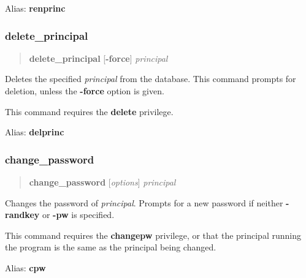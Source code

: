 \documentclass[letterpaper,10pt,english]{sphinxmanual}
\begin{document}
Alias: \textbf{renprinc}
\label{admin/admin_commands/kadmin_local:rename-principal-end}

\subsubsection{delete\_principal}
\label{admin/admin_commands/kadmin_local:id4}\label{admin/admin_commands/kadmin_local:delete-principal}\label{admin/admin_commands/kadmin_local:rename-principal-end}\begin{quote}

\textbf{delete\_principal} {[}\textbf{-force}{]} \emph{principal}
\end{quote}

Deletes the specified \emph{principal} from the database.  This command
prompts for deletion, unless the \textbf{-force} option is given.

This command requires the \textbf{delete} privilege.

Alias: \textbf{delprinc}
\label{admin/admin_commands/kadmin_local:delete-principal-end}

\subsubsection{change\_password}
\label{admin/admin_commands/kadmin_local:id5}\label{admin/admin_commands/kadmin_local:delete-principal-end}\label{admin/admin_commands/kadmin_local:change-password}\begin{quote}

\textbf{change\_password} {[}\emph{options}{]} \emph{principal}
\end{quote}

Changes the password of \emph{principal}.  Prompts for a new password if
neither \textbf{-randkey} or \textbf{-pw} is specified.

This command requires the \textbf{changepw} privilege, or that the
principal running the program is the same as the principal being
changed.

Alias: \textbf{cpw}
\end{document}

